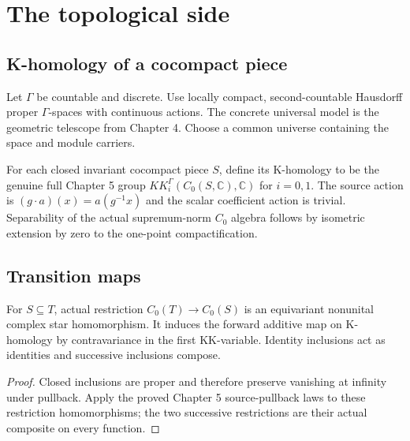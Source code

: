 \chapter{The topological side}
\label{ch:topological-k-homology}

\section{K-homology of a cocompact piece}
Let $\Gamma$ be countable and discrete. Use locally compact,
second-countable Hausdorff proper $\Gamma$-spaces with continuous actions.
The concrete universal model is the geometric telescope from Chapter 4.
Choose a common universe containing the space and module carriers.

\begin{definition}\label{def:piece-k-homology}
\leanok
For each closed invariant cocompact piece $S$, define its K-homology
to be the genuine full Chapter 5 group
$KK_i^\Gamma(C_0(S,\mathbb C),\mathbb C)$ for $i=0,1$.
The source action is $(g\cdot a)(x)=a(g^{-1}x)$ and the scalar
coefficient action is trivial. Separability of the actual supremum-norm
$C_0$ algebra follows by isometric extension by zero to the one-point
compactification.
\end{definition}

\section{Transition maps}
\begin{proposition}\label{prop:topological-transition}
\leanok
For $S\subseteq T$, actual restriction $C_0(T)\to C_0(S)$ is an
equivariant nonunital complex star homomorphism. It induces the forward
additive map on K-homology by contravariance in the first KK-variable.
Identity inclusions act as identities and successive inclusions compose.
\end{proposition}
\begin{proof}
\leanok
Closed inclusions are proper and therefore preserve vanishing at infinity
under pullback. Apply the proved Chapter 5 source-pullback laws to these
restriction homomorphisms; the two successive restrictions are their actual
composite on every function.
\end{proof}


